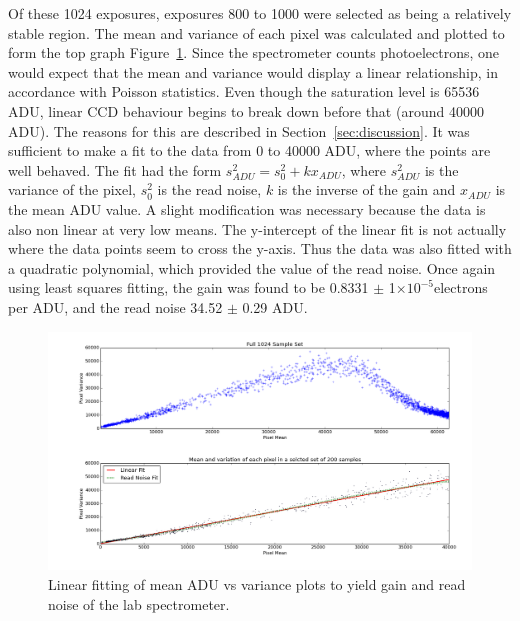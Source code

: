 \documentclass[a4paper,12pt]{article}
\providecommand{\e}[1]{\ensuremath{\times 10^{#1}}}
\begin{document}
Of these 1024 exposures, exposures 800 to 1000 were selected as being a relatively stable region. The mean and variance of each pixel was calculated and plotted to form the top graph Figure~\ref{fig:gain}. Since the spectrometer counts photoelectrons, one would expect that the mean and variance would display a linear relationship, in accordance with Poisson statistics. Even though the saturation level is 65536 ADU, linear CCD behaviour begins to break down before that (around 40000 ADU). The reasons for this are described in Section~\ref{sec:discussion}. It was sufficient to make a fit to the data from 0 to 40000 ADU, where the points are well behaved. The fit had the form $s^2_{ADU}=s^2_0+kx_{ADU}$, where $s^2_{ADU}$ is the variance of the pixel, $s^2_0$ is the read noise, $k$ is the inverse of the gain and $x_{ADU}$ is the mean ADU value. A slight modification was necessary because the data is also non linear at very low means. The y-intercept of the linear fit is not actually where the data points seem to cross the y-axis. Thus the data was also fitted with a quadratic polynomial, which provided the value of the read noise. Once again using least squares fitting, the gain was found to be 0.8331 $\pm$ 1\e{-5}electrons per ADU, and the read noise 34.52 $\pm$ 0.29 ADU.

\begin{figure}[!htbp]
\centering
\includegraphics[scale = 0.35]{gain_readnoise2.png}
\caption{Linear fitting of mean ADU vs variance plots to yield gain and read noise of the lab spectrometer. }
\label{fig:gain}
\end{figure}
\end{document}
